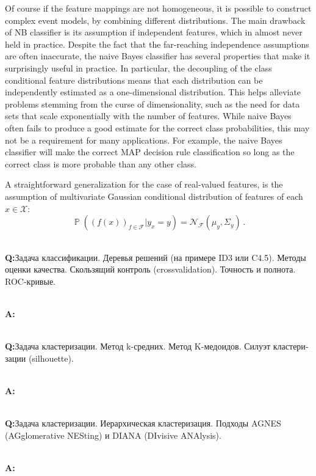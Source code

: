 \documentclass[a4paper,14pt]{extarticle}
\newcommand{\Fcal}{\mathcal{F}}
\newcommand{\Ncal}{\mathcal{N}}
\newcommand{\Xcal}{\mathcal{X}}
\newcommand{\pr}{\mathop{\mathbb{P}}\nolimits}
\newcommand{\rus}[1]{\foreignlanguage{russian}{#1}}
\begin{document}

Of course if the feature mappings are not homogeneous, it is possible to construct
complex event models, by combining different distributions. The main drawback of
NB classifier is its assumption if independent features, which in almost never held
in practice. Despite the fact that the far-reaching independence assumptions are
often inaccurate, the naive Bayes classifier has several properties that make it
surprisingly useful in practice. In particular, the decoupling of the class conditional
feature distributions means that each distribution can be independently estimated
as a one-dimensional distribution. This helps alleviate problems stemming from the
curse of dimensionality, such as the need for data sets that scale exponentially
with the number of features. While naive Bayes often fails to produce a good estimate
for the correct class probabilities, this may not be a requirement for many applications.
For example, the naive Bayes classifier will make the correct MAP decision rule
classification so long as the correct class is more probable than any other class.

A straightforward generalization for the case of real-valued features, is the assumption
of multivariate Gaussian conditional distribution of features of each $x\in \Xcal$:
$$ \pr((f(x))_{f\in \Fcal}| y_x=y) = \Ncal_\Fcal(\mu_y, \Sigma_y) \,. $$

\hfill\\\textbf{Q:}\rus{Задача классификации. Деревья решений (на примере ID3 или
C4.5). Методы оценки качества. Скользящий контроль (crossvalidation). Точность и
полнота. ROC-кривые.}

\hfill\\\textbf{A:}

\hfill\\\textbf{Q:}\rus{Задача кластеризации. Метод k-средних. Метод K-медоидов.
Силуэт кластеризации (silhouette).}

\hfill\\\textbf{A:}

\hfill\\\textbf{Q:}\rus{Задача кластеризации. Иерархическая кластеризация. Подходы
AGNES (AGglomerative NESting) и DIANA (DIvisive ANAlysis).}

\hfill\\\textbf{A:}
\end{document}
